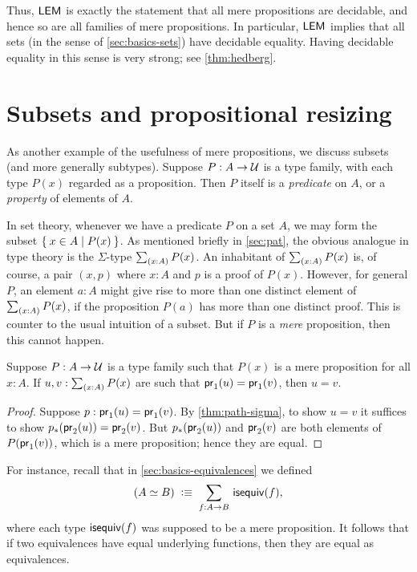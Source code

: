 Thus, $\mathsf{LEM}_{}$ is exactly the statement that all mere propositions are decidable, and hence so are all families of mere propositions.
In particular, $\mathsf{LEM}_{}$ implies that all sets (in the sense of \cref{sec:basics-sets}) have decidable equality.
Having decidable equality in this sense is very strong; see \cref{thm:hedberg}.

%
%

\section{Subsets and propositional resizing}
\label{subsec:prop-subsets}

%

As another example of the usefulness of mere propositions, we discuss subsets (and more generally subtypes).
Suppose $P:A\to\mathcal{U}$ is a type family, with each type $P(x)$ regarded as a proposition.
Then $P$ itself is a \emph{predicate} on $A$, or a \emph{property} of elements of $A$.

In set theory, whenever we have a predicate $P$ on a set $A$, we may form the subset $\Set{x\in A | P(x)}$.
As mentioned briefly in \cref{sec:pat}, the obvious analogue in type theory is the $\Sigma$-type $\sm{x:A} P(x)$.
An inhabitant of $\sm{x:A} P(x)$ is, of course, a pair $(x,p)$ where $x:A$ and $p$ is a proof of $P(x)$.
However, for general $P$, an element $a:A$ might give rise to more than one distinct element of $\sm{x:A} P(x)$, if the proposition $P(a)$ has more than one distinct proof.
This is counter to the usual intuition of a subset.
But if $P$ is a \emph{mere} proposition, then this cannot happen.

\begin{lem}\label{thm:path-subset}
  Suppose $P:A\to\mathcal{U}$ is a type family such that $P(x)$ is a mere proposition for all $x:A$.
  If $u,v:\sm{x:A} P(x)$ are such that $\mathsf{pr}_{1}(u) = \mathsf{pr}_{1}(v)$, then $u=v$.
\end{lem}
\begin{proof}
  Suppose $p:\mathsf{pr}_{1}(u) = \mathsf{pr}_{1}(v)$.
  By \cref{thm:path-sigma}, to show $u=v$ it suffices to show ${p}_{*}\mathopen{}\left({\mathsf{pr}_{2}(u)}\right)\mathclose{} = \mathsf{pr}_{2}(v)$.
  But ${p}_{*}\mathopen{}\left({\mathsf{pr}_{2}(u)}\right)\mathclose{}$ and $\mathsf{pr}_{2}(v)$ are both elements of $P(\mathsf{pr}_{1}(v))$, which is a mere proposition; hence they are equal.
\end{proof}

For instance, recall that in \cref{sec:basics-equivalences} we defined
\[(\eqv A B) \;\defeq\; \sm{f:A\to B} \isequiv (f),\]
where each type $\mathsf{isequiv} (f)$ was supposed to be a mere proposition.
It follows that if two equivalences have equal underlying functions, then they are equal as equivalences.

